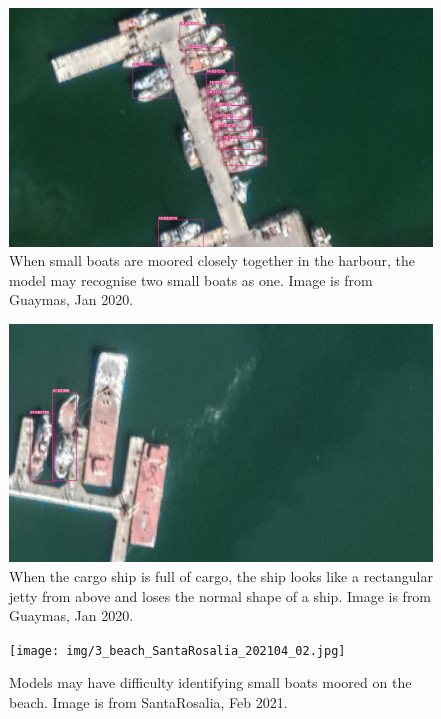 \begin{figure}[h!]
    \centering
    \includegraphics[scale=0.105]{img/1_docked_together_Guaymas_202001_20.jpg}
    \caption{When small boats are moored closely together in the harbour, the model may recognise two small boats as one. Image is from Guaymas, Jan 2020.}
    \label{fig:1_docked_together_Guaymas_202001_20}
\end{figure}


\begin{figure}[h!]
    \centering
    \includegraphics[scale=0.105]{img/2_square_Guaymas_202001_01.jpg}
    \caption{When the cargo ship is full of cargo, the ship looks like a rectangular jetty from above and loses the normal shape of a ship. Image is from Guaymas, Jan 2020.}
    \label{fig:2_square_Guaymas_202001_01}
\end{figure}

\begin{figure}[h!]
    \centering
    \texttt{[image: img/3\_beach\_SantaRosalia\_202104\_02.jpg]}
    \caption{Models may have difficulty identifying small boats moored on the beach. Image is from SantaRosalia, Feb 2021.}
    \label{fig:3_beach_SantaRosalia_202104_02}
\end{figure}

